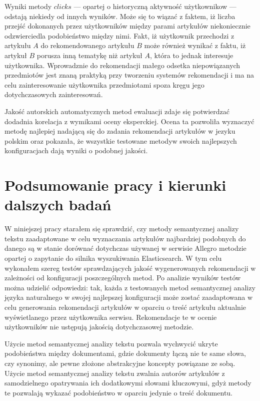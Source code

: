 \documentclass[pl]{minipw} %
\begin{document}
Wyniki metody $clicks$ --- opartej o historyczną aktywność użytkownikow --- odstają niekiedy od innych wyników. Może się to wiązać z faktem, iż liczba przejść dokonanych przez użytkowników między parami artykułów niekoniecznie odzwierciedla podobieństwo między nimi. Fakt, iż użytkownik przechodzi z artykułu $A$ do rekomendowanego artykułu $B$ może również wynikać z faktu, iż artykuł $B$ porusza inną tematykę niż artykuł $A$, która to jednak interesuje użytkownika. Wprowadznie do rekomendacji małego odsetka niepowiązanych przedmiotów jest znaną praktyką przy tworzeniu systemów rekomendacji i ma na celu zainteresowanie użytkownika przedmiotami spoza kręgu jego dotychczasowych zainteresowań.

Jakość autorskich automatycznych metod ewaluacji zdaje się potwierdzać dodadnia korelacja z wymikami oceny eksperckiej. Ocena ta pozwoliła wyznaczyć metodę najlepiej nadającą się do zadania rekomendacji artykułów w jezyku polskim oraz pokazała, że wszystkie testowane metodyw swoich najlepszych konfiguracjach dają wyniki o podobnej jakości. 


\chapter{Podsumowanie pracy i kierunki dalszych badań}

W niniejszej pracy starałem się sprawdzić, czy metody semantycznej analizy tekstu zaadaptowane w celu wyznaczania artykułów najbardziej podobnych do danego są w stanie dorównać dotychczas używanej w serwisie Allegro metodzie opartej o zapytanie do silnika wyszukiwania Elasticsearch. W tym celu wykonałem szereg testów sprawdzających jakość wygenerowanych rekomendacji w zależności od konfiguracji poszczególnych metod. Po analizie wyników testów można udzielić odpowiedzi: tak, każda z testowanych metod semantycznej analizy języka naturalnego w swojej najlepszej konfiguracji może zostać zaadaptowana w celu generowania rekomendacji artykułów w oparciu o treść artykułu aktualnie wyświetlanego przez użytkownika serwisu. Rekomendacje te w ocenie  użytkowników nie ustępują jakością dotychczasowej metodzie. 

Użycie metod semantycznej analizy tekstu pozwala wychwycić ukryte podobieństwa między dokumentami, gdzie dokumenty łączą nie te same słowa, czy synonimy, ale pewne złożone abstrakcyjne koncepty powiązane ze sobą. Użycie metod semantycznej analizy tekstu zwalnia autorów artykułów z samodzielnego opatrywania ich dodatkowymi słowami kluczowymi, gdyż metody te pozwalają wykazać podobieństwo w oparciu jedynie o treść dokumentu.
\end{document}
